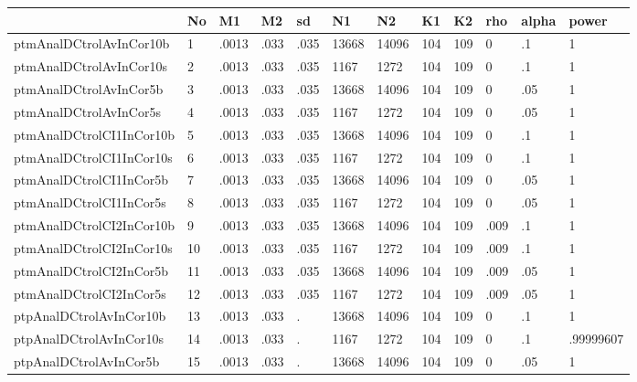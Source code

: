 \begin{table}[htbp]
\begin{tabular}{|l|l|l|l|l|l|l|l|l|l|l|l|}\hline  
 & No  & M1  & M2  & sd  & N1  & N2  & K1  & K2  & rho  & alpha  & power  \\ \hline  
ptmAnalDCtrolAvInCor10b & 1 & .0013 & .033 & .035 & 13668 & 14096 & 104 & 109 & 0 & .1 & 1 \\ \hline 
ptmAnalDCtrolAvInCor10s & 2 & .0013 & .033 & .035 & 1167 & 1272 & 104 & 109 & 0 & .1 & 1 \\ \hline 
ptmAnalDCtrolAvInCor5b & 3 & .0013 & .033 & .035 & 13668 & 14096 & 104 & 109 & 0 & .05 & 1 \\ \hline 
ptmAnalDCtrolAvInCor5s & 4 & .0013 & .033 & .035 & 1167 & 1272 & 104 & 109 & 0 & .05 & 1 \\ \hline 
ptmAnalDCtrolCI1InCor10b & 5 & .0013 & .033 & .035 & 13668 & 14096 & 104 & 109 & 0 & .1 & 1 \\ \hline 
ptmAnalDCtrolCI1InCor10s & 6 & .0013 & .033 & .035 & 1167 & 1272 & 104 & 109 & 0 & .1 & 1 \\ \hline 
ptmAnalDCtrolCI1InCor5b & 7 & .0013 & .033 & .035 & 13668 & 14096 & 104 & 109 & 0 & .05 & 1 \\ \hline 
ptmAnalDCtrolCI1InCor5s & 8 & .0013 & .033 & .035 & 1167 & 1272 & 104 & 109 & 0 & .05 & 1 \\ \hline 
ptmAnalDCtrolCI2InCor10b & 9 & .0013 & .033 & .035 & 13668 & 14096 & 104 & 109 & .009 & .1 & 1 \\ \hline 
ptmAnalDCtrolCI2InCor10s & 10 & .0013 & .033 & .035 & 1167 & 1272 & 104 & 109 & .009 & .1 & 1 \\ \hline 
ptmAnalDCtrolCI2InCor5b & 11 & .0013 & .033 & .035 & 13668 & 14096 & 104 & 109 & .009 & .05 & 1 \\ \hline 
ptmAnalDCtrolCI2InCor5s & 12 & .0013 & .033 & .035 & 1167 & 1272 & 104 & 109 & .009 & .05 & 1 \\ \hline 
ptpAnalDCtrolAvInCor10b & 13 & .0013 & .033 & . & 13668 & 14096 & 104 & 109 & 0 & .1 & 1 \\ \hline 
ptpAnalDCtrolAvInCor10s & 14 & .0013 & .033 & . & 1167 & 1272 & 104 & 109 & 0 & .1 & .99999607 \\ \hline 
ptpAnalDCtrolAvInCor5b & 15 & .0013 & .033 & . & 13668 & 14096 & 104 & 109 & 0 & .05 & 1 \\ \hline 

\end{tabular}
\end{table}
